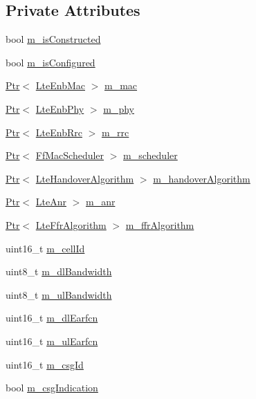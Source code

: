 \subsection*{Private Attributes}
\begin{DoxyCompactItemize}
\item 
bool \hyperlink{classns3_1_1LteEnbNetDevice_a56d640f8ffe3e2f39c49ab37407e56b9}{m\+\_\+is\+Constructed}
\item 
bool \hyperlink{classns3_1_1LteEnbNetDevice_a4a5da0eaa59271c590fab53ed54b5e0d}{m\+\_\+is\+Configured}
\item 
\hyperlink{classns3_1_1Ptr}{Ptr}$<$ \hyperlink{classns3_1_1LteEnbMac}{Lte\+Enb\+Mac} $>$ \hyperlink{classns3_1_1LteEnbNetDevice_ab1d201589711cdfda0bb52f37b01be5d}{m\+\_\+mac}
\item 
\hyperlink{classns3_1_1Ptr}{Ptr}$<$ \hyperlink{classns3_1_1LteEnbPhy}{Lte\+Enb\+Phy} $>$ \hyperlink{classns3_1_1LteEnbNetDevice_aefbda8e36daddbf68d0488e032ca8065}{m\+\_\+phy}
\item 
\hyperlink{classns3_1_1Ptr}{Ptr}$<$ \hyperlink{classns3_1_1LteEnbRrc}{Lte\+Enb\+Rrc} $>$ \hyperlink{classns3_1_1LteEnbNetDevice_a82f434e1c6e250945e6b0c48fb3c9ea7}{m\+\_\+rrc}
\item 
\hyperlink{classns3_1_1Ptr}{Ptr}$<$ \hyperlink{classns3_1_1FfMacScheduler}{Ff\+Mac\+Scheduler} $>$ \hyperlink{classns3_1_1LteEnbNetDevice_a5b9b286d0e44d109361ac449beec9833}{m\+\_\+scheduler}
\item 
\hyperlink{classns3_1_1Ptr}{Ptr}$<$ \hyperlink{classns3_1_1LteHandoverAlgorithm}{Lte\+Handover\+Algorithm} $>$ \hyperlink{classns3_1_1LteEnbNetDevice_a3b8d9155a06dbda03d264ca8160d45b1}{m\+\_\+handover\+Algorithm}
\item 
\hyperlink{classns3_1_1Ptr}{Ptr}$<$ \hyperlink{classns3_1_1LteAnr}{Lte\+Anr} $>$ \hyperlink{classns3_1_1LteEnbNetDevice_a0d2e3dc6554054a072aea2680f21c622}{m\+\_\+anr}
\item 
\hyperlink{classns3_1_1Ptr}{Ptr}$<$ \hyperlink{classns3_1_1LteFfrAlgorithm}{Lte\+Ffr\+Algorithm} $>$ \hyperlink{classns3_1_1LteEnbNetDevice_adb9f14fdd2cd1c70502747e2de2d9332}{m\+\_\+ffr\+Algorithm}
\item 
uint16\+\_\+t \hyperlink{classns3_1_1LteEnbNetDevice_a8e83ce1a84658cd8a99ffe3c6981e067}{m\+\_\+cell\+Id}
\item 
uint8\+\_\+t \hyperlink{classns3_1_1LteEnbNetDevice_a3b948a066eba813c9dd4a5bcc21e8073}{m\+\_\+dl\+Bandwidth}
\item 
uint8\+\_\+t \hyperlink{classns3_1_1LteEnbNetDevice_a2dfb0b63b26f94d4e19aa93ddf7a9187}{m\+\_\+ul\+Bandwidth}
\item 
uint16\+\_\+t \hyperlink{classns3_1_1LteEnbNetDevice_a83a5acd3846339fc92e5b7693fa0faef}{m\+\_\+dl\+Earfcn}
\item 
uint16\+\_\+t \hyperlink{classns3_1_1LteEnbNetDevice_a0760bf2c3e1199b2196c01d99d7221b7}{m\+\_\+ul\+Earfcn}
\item 
uint16\+\_\+t \hyperlink{classns3_1_1LteEnbNetDevice_ae2d1e7c4978965069e4ae7acd01d6c48}{m\+\_\+csg\+Id}
\item 
bool \hyperlink{classns3_1_1LteEnbNetDevice_ac034873d43e9dce02622ca6c311171e2}{m\+\_\+csg\+Indication}
\end{DoxyCompactItemize}
